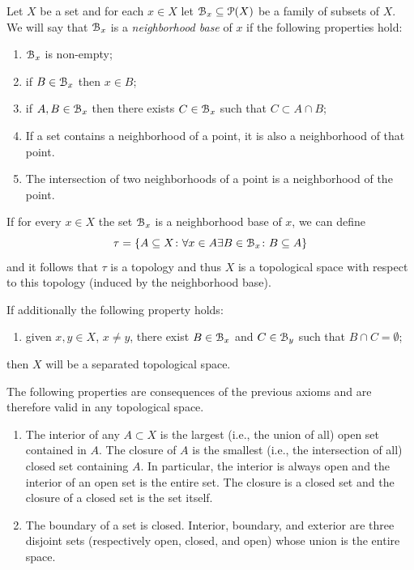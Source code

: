 \begin{definition}
Let $X$ be a set and for each $x\in X$ let $\mathcal B_x\subseteq \mathcal P(X)$
be a family of subsets of $X$. We will say that $\mathcal B_x$ is a
\emph{neighborhood base}%
 of $x$ if the following properties hold:
\begin{enumerate}
\item $\mathcal B_x$ is non-empty;
\item if $B\in \mathcal B_x$ then $x \in B$;
\item if $A,B\in \mathcal B_x$ then there exists $C\in \mathcal B_x$ such that $C\subset A\cap B$;

\item If a set contains a neighborhood of a point, it is also a neighborhood of that point.
\item The intersection of two neighborhoods of a point is a neighborhood of the point.
\end{enumerate}

If for every $x\in X$ the set $\mathcal B_x$ is a neighborhood base of $x$, we can
define
\[
  \tau = {\left\{ A \subseteq X\colon \forall x\in A \exists B \in \mathcal B_x \colon B\subseteq A \right\}}
\]
and it follows that $\tau$ is a topology and thus $X$ is a topological space
with respect to this topology (induced by the neighborhood base).

If additionally the following property holds:
\begin{enumerate}
\item given $x,y\in X$, $x\neq y$, there exist $B\in \mathcal B_x$ and $C\in \mathcal B_y$ such that
$B\cap C=\emptyset$;
\end{enumerate}
then $X$ will be a separated topological space.
\end{definition}

The following properties are consequences of the previous axioms and are
therefore valid in any topological space.

\begin{enumerate}
\item
The interior of any $A\subset X$ is the largest (i.e., the union of all) open
set contained in $A$. The closure of $A$ is the smallest (i.e., the intersection
of all) closed set containing $A$.
In particular, the interior is always open and the interior of an open set is
the entire set. The closure is a closed set and the closure of a closed set is
the set itself.
\item
The boundary of a set is closed. Interior, boundary, and exterior are three
disjoint sets (respectively open, closed, and open) whose union is the entire
space.
\end{enumerate}

